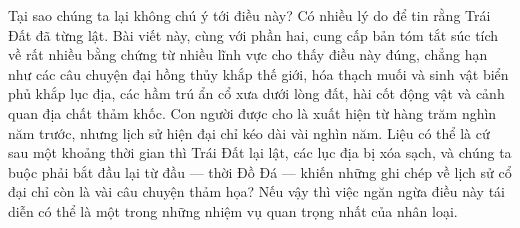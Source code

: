 \documentclass[10pt,twocolumn,letterpaper]{article}
\begin{document}
Tại sao chúng ta lại không chú ý tới điều này? Có nhiều lý do để tin rằng Trái Đất đã từng lật. Bài viết này, cùng với phần hai, cung cấp bản tóm tắt súc tích về rất nhiều bằng chứng từ nhiều lĩnh vực cho thấy điều này đúng, chẳng hạn như các câu chuyện đại hồng thủy khắp thế giới, hóa thạch muối và sinh vật biển phủ khắp lục địa, các hầm trú ẩn cổ xưa dưới lòng đất, hài cốt động vật và cảnh quan địa chất thảm khốc. Con người được cho là xuất hiện từ hàng trăm nghìn năm trước, nhưng lịch sử hiện đại chỉ kéo dài vài nghìn năm. Liệu có thể là cứ sau một khoảng thời gian thì Trái Đất lại lật, các lục địa bị xóa sạch, và chúng ta buộc phải bắt đầu lại từ đầu — thời Đồ Đá — khiến những ghi chép về lịch sử cổ đại chỉ còn là vài câu chuyện thảm họa? Nếu vậy thì việc ngăn ngừa điều này tái diễn có thể là một trong những nhiệm vụ quan trọng nhất của nhân loại.
\end{document}
